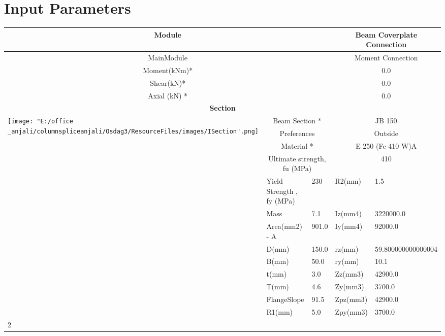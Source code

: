 \documentclass{article}%
\begin{document}
%
\normalsize%
\pagestyle{header}%
\section{Input Parameters}%
\label{sec:InputParameters}%
\renewcommand{\arraystretch}{1.2}%
\begin{longtable}{|p{5cm}|p{2cm}|p{2cm}|p{2cm}|p{5cm}|}%
\hline%
\hline%
\multicolumn{3}{|c|}{Module}&\multicolumn{2}{|c|}{Beam Coverplate Connection}\\%
\hline%
\hline%
\multicolumn{3}{|c|}{MainModule}&\multicolumn{2}{|c|}{Moment Connection}\\%
\hline%
\hline%
\multicolumn{3}{|c|}{Moment(kNm)*}&\multicolumn{2}{|c|}{0.0}\\%
\hline%
\hline%
\multicolumn{3}{|c|}{Shear(kN)*}&\multicolumn{2}{|c|}{0.0}\\%
\hline%
\hline%
\multicolumn{3}{|c|}{Axial (kN) *}&\multicolumn{2}{|c|}{0.0}\\%
\hline%
\hline%
\multicolumn{5}{|c|}{\textbf{Section}}\\%
\hline%
\hline%
\multirow{13}{*}{\texttt{[image: "E:/office \_anjali/columnspliceanjali/Osdag3/ResourceFiles/images/ISection".png]}}&\multicolumn{2}{|c|}{Beam Section *}&\multicolumn{2}{|c|}{JB 150}\\%
\cline{2%
-%
5}%
&\multicolumn{2}{|c|}{Preferences}&\multicolumn{2}{|c|}{Outside}\\%
\cline{2%
-%
5}%
&\multicolumn{2}{|c|}{Material *}&\multicolumn{2}{|c|}{E 250 (Fe 410 W)A}\\%
\cline{2%
-%
5}%
&\multicolumn{2}{|c|}{Ultimate strength, fu (MPa)}&\multicolumn{2}{|c|}{410}\\%
\cline{2%
-%
5}%
&Yield Strength , fy (MPa)&230&R2(mm)&1.5\\%
\cline{2%
-%
5}%
&Mass&7.1&Iz(mm4)&3220000.0\\%
\cline{2%
-%
5}%
&Area(mm2) {-} A&901.0&Iy(mm4)&92000.0\\%
\cline{2%
-%
5}%
&D(mm)&150.0&rz(mm)&59.800000000000004\\%
\cline{2%
-%
5}%
&B(mm)&50.0&ry(mm)&10.1\\%
\cline{2%
-%
5}%
&t(mm)&3.0&Zz(mm3)&42900.0\\%
\cline{2%
-%
5}%
&T(mm)&4.6&Zy(mm3)&3700.0\\%
\cline{2%
-%
5}%
&FlangeSlope&91.5&Zpz(mm3)&42900.0\\%
\cline{2%
-%
5}%
&R1(mm)&5.0&Zpy(mm3)&3700.0\\%
\cline{2%
}
\end{longtable}
\end{document}
